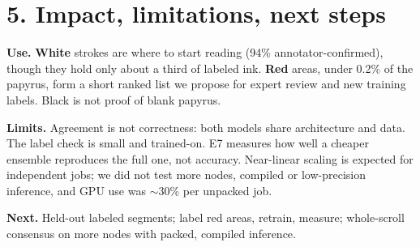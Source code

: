\documentclass[9pt,letterpaper,twocolumn]{extarticle}
\begin{document}
\section{5. Impact, limitations, next steps}
\textbf{Use.} \textbf{White} strokes are where to start reading (94\% annotator-confirmed), though they hold only about a third of labeled ink. \textbf{Red} areas, under 0.2\% of the papyrus, form a short ranked list we propose for expert review and new training labels. Black is not proof of blank papyrus.

\textbf{Limits.} Agreement is not correctness: both models share architecture and data. The label check is small and trained-on. E7 measures how well a cheaper ensemble reproduces the full one, not accuracy. Near-linear scaling is expected for independent jobs; we did not test more nodes, compiled or low-precision inference, and GPU use was $\sim$30\% per unpacked job.

\textbf{Next.} Held-out labeled segments; label red areas, retrain, measure; whole-scroll consensus on more nodes with packed, compiled inference.
\end{document}

